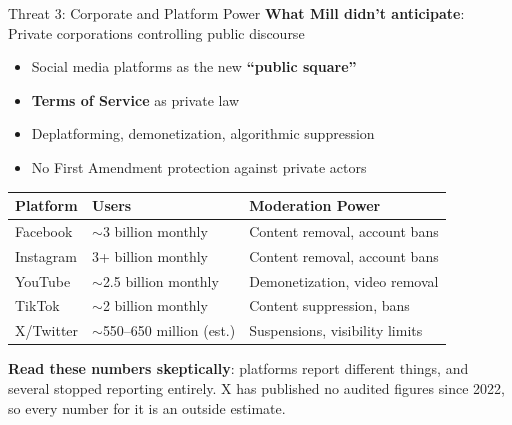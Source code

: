 ﻿\documentclass[aspectratio=169,11pt]{beamer}
\begin{document}
\begin{frame}{Threat 3: Corporate and Platform Power}
\textbf{What Mill didn't anticipate}: Private corporations controlling public discourse

\begin{itemize}
    \item Social media platforms as the new \textbf{``public square''}
    \item \textbf{Terms of Service} as private law
    \item Deplatforming, demonetization, algorithmic suppression
    \item No First Amendment protection against private actors
\end{itemize}

\vspace{0.3cm}
\begin{table}[h]
\centering
\small
\begin{tabular}{l l l}
\toprule
\textbf{Platform} & \textbf{Users} & \textbf{Moderation Power} \\
\midrule
Facebook & $\sim$3 billion monthly & Content removal, account bans \\
Instagram & 3+ billion monthly & Content removal, account bans \\
YouTube & $\sim$2.5 billion monthly & Demonetization, video removal \\
TikTok & $\sim$2 billion monthly & Content suppression, bans \\
X/Twitter & $\sim$550--650 million (est.) & Suspensions, visibility limits \\
\bottomrule
\end{tabular}
\end{table}

{\scriptsize \textbf{Read these numbers skeptically}: platforms report different things, and several stopped reporting entirely. X has published no audited figures since 2022, so every number for it is an outside estimate.}
\end{frame}
\end{document}

